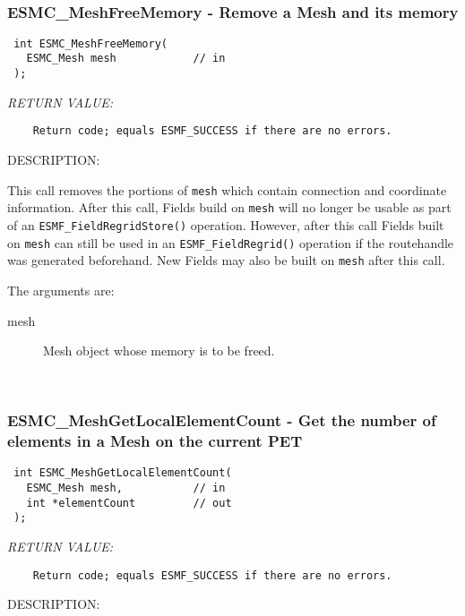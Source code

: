  
\mbox{}\hrulefill\ 
 
\subsubsection [ESMC\_MeshFreeMemory] {ESMC\_MeshFreeMemory - Remove a Mesh and its memory}


  
\begin{verbatim} int ESMC_MeshFreeMemory(
   ESMC_Mesh mesh            // in
 );
 \end{verbatim}{\em RETURN VALUE:}
\begin{verbatim}    Return code; equals ESMF_SUCCESS if there are no errors.\end{verbatim}
{\sf DESCRIPTION:\\ }


      This call removes the portions of {\tt mesh} which contain connection and coordinate
      information. After this call, Fields build on {\tt mesh} will no longer be usable
      as part of an {\tt ESMF\_FieldRegridStore()} operation. However, after this call
      Fields built on {\tt mesh} can still be used in an {\tt ESMF\_FieldRegrid()}
      operation if the routehandle was generated beforehand. New Fields may also
      be built on {\tt mesh} after this call.
  
   The arguments are:
   \begin{description}
   \item [mesh]
   Mesh object whose memory is to be freed.
   \end{description}
   
 
\mbox{}\hrulefill\ 
 
\subsubsection [ESMC\_MeshGetLocalElementCount] {ESMC\_MeshGetLocalElementCount - Get the number of elements in a Mesh on the current PET}


  
\begin{verbatim} int ESMC_MeshGetLocalElementCount(
   ESMC_Mesh mesh,           // in
   int *elementCount         // out
 );
 \end{verbatim}{\em RETURN VALUE:}
\begin{verbatim}    Return code; equals ESMF_SUCCESS if there are no errors.\end{verbatim}
{\sf DESCRIPTION:\\ }


